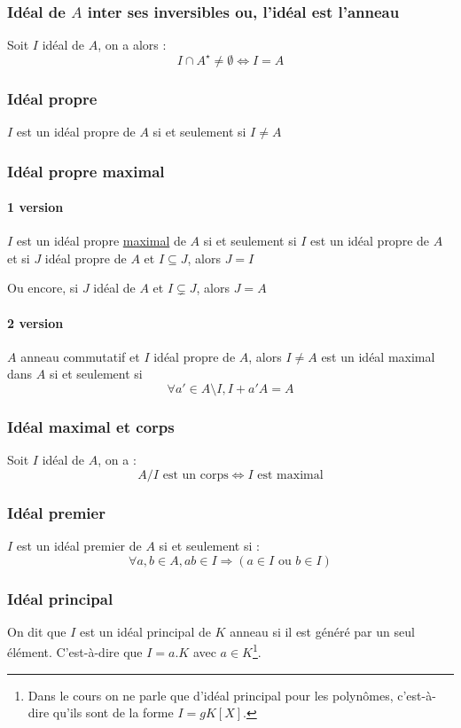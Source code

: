 \documentclass[a4paper,10pt]{article}
\newcommand{\so}{\Rightarrow} %
\newcommand{\ioi}{\Leftrightarrow} %
\newcommand{\mfootnote}[1]{\up{(}\footnote{#1}\up{)}}
\begin{document}
  \subsubsection{Idéal de $A$ inter ses inversibles ou, l'idéal est l'anneau}
   Soit $I$ idéal de $A$, on a alors : 
   $$I \cap A^\star \neq \emptyset \ioi I=A$$

  \subsubsection{Idéal propre}
   $I$ est un idéal propre de $A$ si et seulement si $I\neq A$

  \subsubsection{Idéal propre maximal}
   \paragraph{1 version} $I$ est un idéal propre \underline{maximal} de $A$ si et seulement si $I$ est un idéal propre de $A$ et si $J$ idéal propre de $A$ et $I \subseteq J$, alors $J=I$

    Ou encore, si $J$ idéal de $A$ et $I \subsetneq J$, alors $J=A$

   \paragraph{2 version} $A$ anneau commutatif et $I$ idéal propre de $A$, alors $I\neq A$ est un idéal maximal dans $A$ si et seulement si 
   $$\forall a' \in A\setminus I, I+a'A=A$$

  \subsubsection{Idéal maximal et corps}
   Soit $I$ idéal de $A$, on a :
   $$A/I \mbox{ est un corps} \ioi I \mbox{ est maximal}$$

  \subsubsection{Idéal premier}
   $I$ est un idéal premier de $A$ si et seulement si :
    $$\forall a,b \in A, ab\in I \so (a\in I \mbox{ ou } b\in I)$$
  
  \subsubsection{Idéal principal}
   On dit que $I$ est un idéal principal de $K$ anneau si il est généré par un
   seul élément. C'est-à-dire que $I=a.K$ avec $a \in K$\mfootnote{Dans le cours
   on ne parle que d'idéal principal pour les polynômes, c'est-à-dire qu'ils
   sont de la forme $I=gK[X]$.}.
\end{document}
